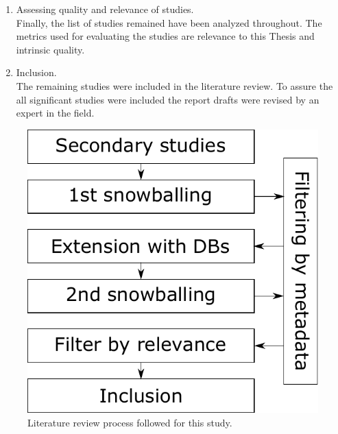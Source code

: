 \begin{enumerate}
    
    \item Assessing quality and relevance of studies.\\
        Finally, the list of studies remained have been analyzed throughout. The metrics used for evaluating the studies are relevance to this Thesis and intrinsic quality.
    
    
    \item Inclusion.\\
        The remaining studies were included in the literature review. To assure the all significant studies were included the report drafts were revised by an expert in the field.
        
\end{enumerate}


\begin{figure}[ht]
    \centering
    \includegraphics[]{figure/literature_review_process.pdf}
    \caption{Literature review process followed for this study.}
    \label{fig:literature_review_process}
\end{figure}